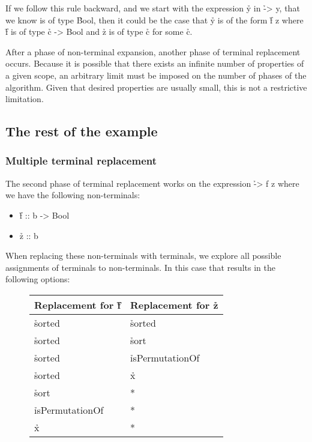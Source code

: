 \documentclass[a4paper, 11pt, onepage]{article}
\begin{document}
If we follow this rule backward, and we start with the expression \h{y} in \h{\x -> y}, that we know is of type \h{Bool}, then it could be the case that \h{y} is of the form \h{f z} where \h{f} is of type \h{c -> Bool} and \h{z} is of type \h{c} for some \h{c}.

After a phase of non-terminal expansion, another phase of terminal replacement occurs.
Because it is possible that there exists an infinite number of properties of a given scope, an arbitrary limit must be imposed on the number of phases of the algorithm.
Given that desired properties are usually small, this is not a restrictive limitation.


\subsection{The rest of the example}

\subsubsection{Multiple terminal replacement}

The second phase of terminal replacement works on the expression \h{\x -> f z} where we have the following non-terminals:

\begin{itemize}
  \item \h{f :: b -> Bool}
  \item \h{z :: b}
\end{itemize}

When replacing these non-terminals with terminals, we explore all possible assignments of terminals to non-terminals.
In this case that results in the following options:

\begin{figure}[H]
  \centering
  \begin{tabular}{|l|l|}
    \hline
    Replacement for \h{f} & Replacement for \h{z} \\
    \hline
    \hline
    \h{sorted}            & \h{sorted}          \\
    \hline
    \h{sorted}            & \h{sort}            \\
    \hline
    \h{sorted}            & \h{isPermutationOf} \\
    \hline
    \h{sorted}            & \h{x}               \\
    \hline
    \h{sort}              & *                   \\
    \hline
    \h{isPermutationOf}   & *                   \\
    \hline
    \h{x}                 & *                   \\
    \hline
  \end{tabular}
\end{figure}
\end{document}
